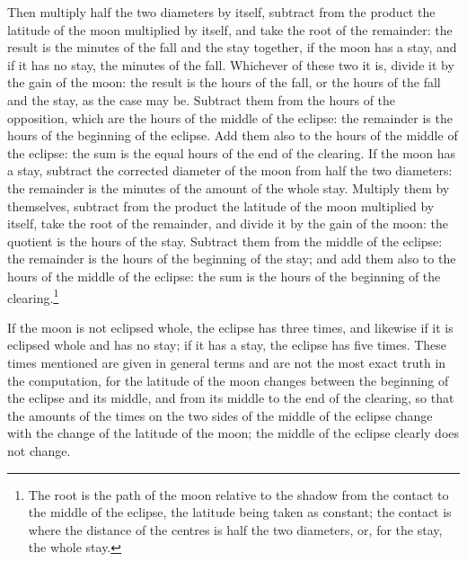 \documentclass[11pt]{article}
\newcommand{\ArPage}[1]{\marginpar{\footnotesize\color{gray}Ar.\,p.\,#1}}
\begin{document}
\par \ArPage{148}Then multiply half the two diameters by itself, subtract from the product the latitude of the moon multiplied by itself, and take the root of the remainder: the result is the minutes of the fall and the stay together, if the moon has a stay, and if it has no stay, the minutes of the fall. Whichever of these two it is, divide it by the gain of the moon: the result is the hours of the fall, or the hours of the fall and the stay, as the case may be. Subtract them from the hours of the opposition, which are the hours of the middle of the eclipse: the remainder is the hours of the beginning of the eclipse. Add them also to the hours of the middle of the eclipse: the sum is the equal hours of the end of the clearing. If the moon has a stay, subtract the corrected diameter of the moon from half the two diameters: the remainder is the minutes of the amount of the whole stay. Multiply them by themselves, subtract from the product the latitude of the moon multiplied by itself, take the root of the remainder, and divide it by the gain of the moon: the quotient is the hours of the stay. Subtract them from the middle of the eclipse: the remainder is the hours of the beginning of the stay; and add them also to the hours of the middle of the eclipse: the sum is the hours of the beginning of the clearing.\footnote{The root is the path of the moon relative to the shadow from the contact to the middle of the eclipse, the latitude being taken as constant; the contact is where the distance of the centres is half the two diameters, or, for the stay, the whole stay.}\par
\par If the moon is not eclipsed whole, the eclipse has three times, and likewise if it is eclipsed whole and has no stay; if it has a stay, the eclipse has five times. These times mentioned are given in general terms and are not the most exact truth in the computation, for the latitude of the moon changes between the beginning of the eclipse and its middle, and from its middle to the end of the clearing, so that the amounts of the times on the two sides of the middle of the eclipse change with the change of the latitude of the moon; the middle of the eclipse clearly does not change.\par
\end{document}
